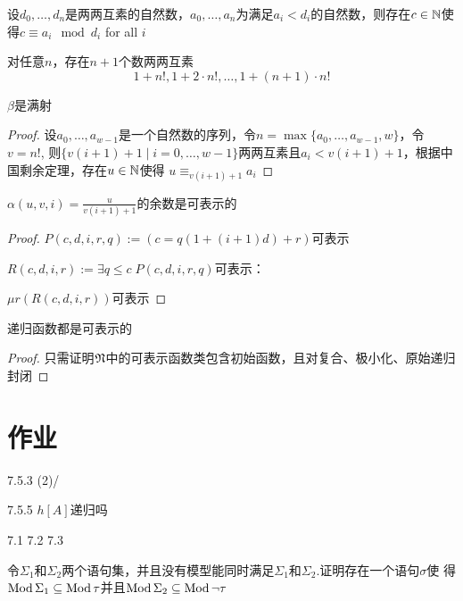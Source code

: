 \documentclass[11pt]{article}
\begin{document}
\begin{theorem}[中国剩余定理]
设\(d_0,\dots,d_n\)是两两互素的自然数，\(a_0,\dots,a_n\)为满足\(a_i<d_i\)的自然数，则存在\(c\in\mathbb{N}\)使
得\(c\equiv a_i\mod d_i\) for all \(i\)
\end{theorem}

\begin{lemma}[]
对任意\(n\)，存在\(n+1\)个数两两互素
\begin{equation*}
1+n!,1+2\cdot n!,\dots,1+(n+1)\cdot n!
\end{equation*}
\end{lemma}

\begin{theorem}[]
\(\beta\)是满射
\end{theorem}

\begin{proof}
设\(a_0,\dots,a_{w-1}\)是一个自然数的序列，令\(n=\max\{a_0,\dots,a_{w-1},w\}\)，令\(v=n!\),
则\(\{v(i+1)+1\mid i=0,\dots,w-1\}\)两两互素且\(a_i<v(i+1)+1\)，根据中国剩余定理，存在\(u\in\mathbb{N}\)使得
\(u\equiv_{v(i+1)+1}a_i\)
\end{proof}

\begin{lemma}[]
\(\alpha(u,v,i)=\frac{u}{v(i+1)+1}\)的余数是可表示的
\end{lemma}

\begin{proof}
\(P(c,d,i,r,q):=(c=q(1+(i+1)d)+r)\)可表示

\(R(c,d,i,r):=\exists q\le c\;P(c,d,i,r,q)\)可表示：

\(\mu r(R(c,d,i,r))\)可表示
\end{proof}

\begin{theorem}[]
递归函数都是可表示的
\end{theorem}

\begin{proof}
只需证明\(\mathfrak{N}\)中的可表示函数类包含初始函数，且对复合、极小化、原始递归封闭
\end{proof}



\section{作业}
\label{sec:org2020d74}
7.5.3 (2)/

7.5.5 \(h[A]\)递归吗

7.1 7.2 7.3

\begin{exercise}
\label{ex8.1.1}
令\(\Sigma_1\)和\(\Sigma_2\)两个语句集，并且没有模型能同时满足\(\Sigma_1\)和\(\Sigma_2\).证明存在一个语句\(\sigma\)使
得\(\operatorname{Mod}\Sigma_1\subseteq\operatorname{Mod}\tau\)并且\(\operatorname{Mod}\Sigma_2\subseteq\operatorname{Mod}\neg\tau\)
\end{exercise}
\end{document}
